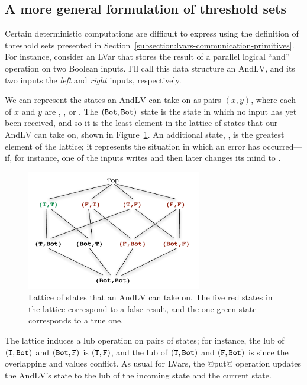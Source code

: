 \subsection{A more general formulation of threshold sets}\label{subsection:lvars-a-more-general-formulation-of-threshold-sets}

Certain deterministic computations are difficult to express using the
definition of threshold sets presented in
Section~\ref{subsection:lvars-communication-primitives}.  For
instance, consider an LVar that stores the result of a parallel
logical ``and'' operation on two Boolean inputs.  I'll call this data
structure an $\mathrm{AndLV}$, and its two inputs the \emph{left} and
\emph{right} inputs, respectively.

We can represent the states an $\mathrm{AndLV}$ can take on as pairs
$(x, y)$, where each of $x$ and $y$ are , , or .
The $(\texttt{Bot},\texttt{Bot})$ state is the state in which no input has yet
been received, and so it is the least element in the lattice of states
that our $\mathrm{AndLV}$ can take on, shown in
Figure~\ref{f:lvars-parallel-and}.  An additional state, , is
the greatest element of the lattice; it represents the situation in
which an error has occurred---if, for instance, one of the inputs
writes  and then later changes its mind to .

\begin{figure}
\begin{center}
  \includegraphics[width=3in]{chapter2/figures/lvars-parallel-and.pdf}
\end{center}
  \caption{Lattice of states that an $\mathrm{AndLV}$ can take on.
    The five red states in the lattice correspond to a false result,
    and the one green state corresponds to a true one.}
  \label{f:lvars-parallel-and}
\end{figure}

The lattice induces a lub operation on pairs of states; for instance,
the lub of $(\texttt{T},\texttt{Bot})$ and $(\texttt{Bot},\texttt{F})$ is $(\texttt{T},\texttt{F})$,
and the lub of $(\texttt{T},\texttt{Bot})$ and $(\texttt{F},\texttt{Bot})$ is  since
the overlapping  and  values conflict.  As usual for
LVars, the @put@ operation updates the $\mathrm{AndLV}$'s state to the
lub of the incoming state and the current state.

